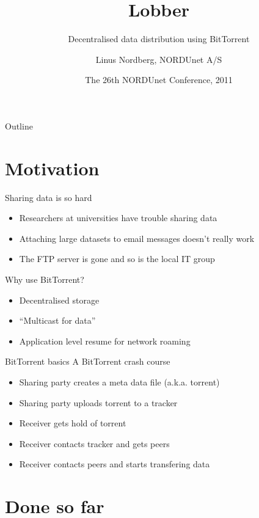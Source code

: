 \documentclass{beamer}
\title{Lobber}
\subtitle{Decentralised data distribution using BitTorrent}
\author{Linus Nordberg, NORDUnet A/S}
\date[NDN 2011]{The 26th NORDUnet Conference, 2011}
\begin{document}
\begin{frame}
  \titlepage
\end{frame}
\begin{frame}{Outline}
  \tableofcontents
\end{frame}
\section{Motivation}

\begin{frame}{Sharing data is so hard}
  \begin{itemize}
  \item
    Researchers at universities have trouble sharing data
  \item
    Attaching large datasets to email messages doesn't really work
  \item
    The FTP server is gone and so is the local IT group
  \end{itemize}
\end{frame}

\begin{frame}{Why use BitTorrent?}
  \begin{itemize}
  \item
    Decentralised storage
  \item
    ``Multicast for data''
  \item
    Application level resume for network roaming
  \end{itemize}
\end{frame}

\begin{frame}{BitTorrent basics}
  A BitTorrent crash course
  \begin{itemize}
  \item
    Sharing party creates a meta data file (a.k.a. torrent)
  \item
    Sharing party uploads torrent to a tracker
  \item
    Receiver gets hold of torrent
  \item
    Receiver contacts tracker and gets peers
  \item
    Receiver contacts peers and starts transfering data
  \end{itemize}
\end{frame}
\section{Done so far}
\end{document}
